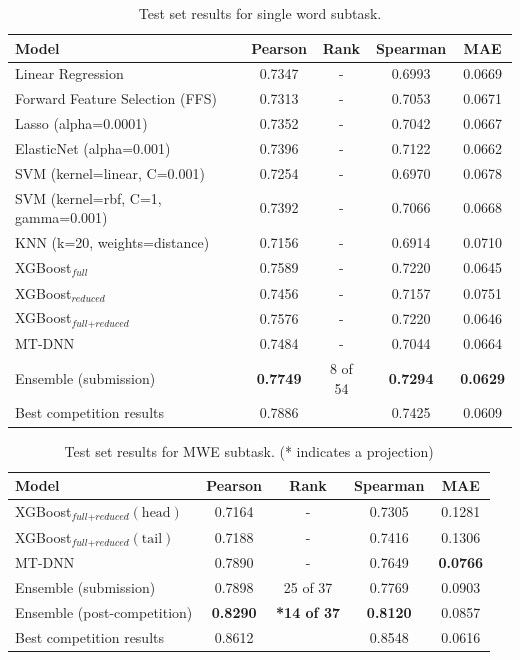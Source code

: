 \documentclass{dcthesis}
\theoremstyle{definition}
\theoremstyle{remark}
\begin{document}
\begin{table}[!htbp]
  \centering
  \begin{tabular}{l|cccc}
    \hline \textbf{Model} & \textbf{Pearson} & \textbf{Rank} & \textbf{Spearman} & \textbf{MAE} \\ \hline
    Linear Regression	& 0.7347 & - &	0.6993 &	0.0669 \\
    Forward Feature Selection (FFS)	& 0.7313 & - &	0.7053 & 0.0671 \\
    Lasso (alpha=0.0001) &	0.7352 & - &	0.7042 & 	0.0667 \\
    ElasticNet (alpha=0.001) &	0.7396 & - &	0.7122 &	0.0662 \\
    SVM (kernel=linear, C=0.001) &	0.7254 & - &	0.6970 &	0.0678 \\
    SVM (kernel=rbf, C=1, gamma=0.001) &	0.7392 & - &	0.7066 &	0.0668 \\
    KNN (k=20, weights=distance) &	0.7156 & -	& 0.6914 &	0.0710 \\
    \hline
    XGBoost$_\textit{full}$ &	0.7589 & - &	0.7220 &	0.0645 \\
    XGBoost$_\textit{reduced}$ &	0.7456 & - &	0.7157 &	0.0751 \\
    XGBoost$_{\textit{full}+\textit{reduced}}$ & 0.7576 & - & 0.7220 & 0.0646 \\
    MT-DNN & 0.7484 & -	& 0.7044 & 0.0664 \\
    Ensemble (submission) & \textbf{0.7749} & 8 of 54 & \textbf{0.7294} & \textbf{0.0629} \\
    \hline
    Best competition results & 0.7886 & & 0.7425 & 0.0609 \\ 
    \hline
  \end{tabular}
  \caption{\label{tab:single-word-results} Test set results for single word subtask. }
\end{table}

\begin{table}[!htbp]
  \centering
  \begin{tabular}{l|cccc}
    \hline \textbf{Model} & \textbf{Pearson} & \textbf{Rank} & \textbf{Spearman} & \textbf{MAE} \\ \hline
    XGBoost$_{\textit{full}+\textit{reduced}}(\text{head})$ & 0.7164 & - & 0.7305 & 0.1281 \\
    XGBoost$_{\textit{full}+\textit{reduced}}(\text{tail})$ & 0.7188 & - & 0.7416 & 0.1306 \\
    MT-DNN & 0.7890 & - & 0.7649 & \textbf{0.0766} \\
    Ensemble (submission) & 0.7898 & 25 of 37 & 0.7769 & 0.0903 \\
    Ensemble (post-competition) & \textbf{0.8290} & \textbf{*14 of 37} & \textbf{0.8120} & 0.0857 \\
    \hline
    Best competition results & 0.8612 & &  0.8548 & 0.0616 \\ 
    \hline
  \end{tabular}
  \caption{\label{tab:multi-word-results} Test set results for MWE subtask. (* indicates a projection)}
\end{table}
\end{document}
